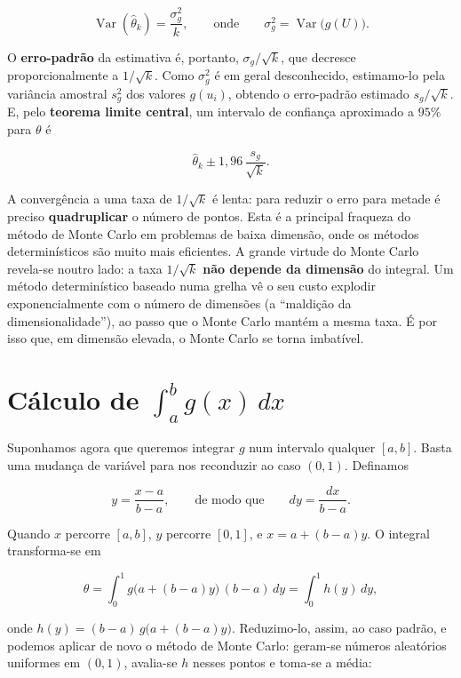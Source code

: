 \documentclass[
  portuguese,
  11pt,
  openany]{book}
\begin{document}
\[
\operatorname{Var}(\hat{\theta}_k) = \frac{\sigma_g^2}{k},
\qquad \text{onde} \qquad
\sigma_g^2 = \operatorname{Var}\big(g(U)\big).
\]

O \textbf{erro-padrão} da estimativa é, portanto, \(\sigma_g / \sqrt{k}\), que decresce
proporcionalmente a \(1/\sqrt{k}\). Como \(\sigma_g^2\) é em geral desconhecido,
estimamo-lo pela variância amostral \(s_g^2\) dos valores \(g(u_i)\), obtendo o
erro-padrão estimado \(s_g/\sqrt{k}\). E, pelo \textbf{teorema limite central}, um
intervalo de confiança aproximado a \(95\%\) para \(\theta\) é

\[
\hat{\theta}_k \pm 1{,}96\,\frac{s_g}{\sqrt{k}}.
\]

A convergência a uma taxa de \(1/\sqrt{k}\) é lenta: para reduzir o erro para
metade é preciso \textbf{quadruplicar} o número de pontos. Esta é a principal
fraqueza do método de Monte Carlo em problemas de baixa dimensão, onde os
métodos determinísticos são muito mais eficientes. A grande virtude do Monte
Carlo revela-se noutro lado: a taxa \(1/\sqrt{k}\) \textbf{não depende da dimensão} do
integral. Um método determinístico baseado numa grelha vê o seu custo explodir
exponencialmente com o número de dimensões (a ``maldição da dimensionalidade''),
ao passo que o Monte Carlo mantém a mesma taxa. É por isso que, em dimensão
elevada, o Monte Carlo se torna imbatível.

\section{\texorpdfstring{Cálculo de \(\int_{a}^{b} g(x)\, dx\)}{Cálculo de \textbackslash int\_\{a\}\^{}\{b\} g(x)\textbackslash, dx}}\label{cuxe1lculo-de-int_ab-gx-dx}

Suponhamos agora que queremos integrar \(g\) num intervalo qualquer \([a, b]\). Basta
uma mudança de variável para nos reconduzir ao caso \((0,1)\). Definamos

\[
y = \frac{x - a}{b - a}, \qquad \text{de modo que} \qquad dy = \frac{dx}{b - a}.
\]

Quando \(x\) percorre \([a, b]\), \(y\) percorre \([0, 1]\), e \(x = a + (b-a)y\). O
integral transforma-se em

\[
\theta = \int_{0}^{1} g\big(a + (b-a)y\big)\,(b-a)\, dy
       = \int_{0}^{1} h(y)\, dy,
\]

onde \(h(y) = (b - a)\, g\big(a + (b - a)y\big)\). Reduzimo-lo, assim, ao caso
padrão, e podemos aplicar de novo o método de Monte Carlo: geram-se números
aleatórios uniformes em \((0,1)\), avalia-se \(h\) nesses pontos e toma-se a média:
\end{document}
